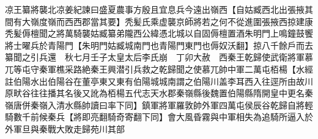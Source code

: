 凉王纂將襲北凉姜紀諫曰盛夏農事方殷且宜息兵今遠出嶺西【自姑臧西北出張掖其間有大嶺度嶺而西西郡當其要】秃髪氏乘虚襲京師將若之何不從進圍張掖西掠建康秃髪傉檀聞之將萬騎襲姑臧纂弟隴西公緯憑北城以自固傉檀置酒朱明門上鳴鐘鼓饗將士曜兵於青陽門【朱明門姑臧城南門也青陽門東門也傉奴沃翻】掠八千餘戶而去纂聞之引兵還　秋七月壬子太皇太后李氏崩　丁卯大赦　西秦王乾歸使武衛將軍慕兀等屯守秦軍樵采路絶秦王興潜引兵救之乾歸聞之使慕兀帥中軍二萬屯栢楊【水經註伯陽水出伯陽谷在董亭東又東有伯陽城城南謂之伯陽川盖李耳西入往逕所由故川原畎谷往往播其名後又訛為栢楊五代志天水郡秦嶺縣後魏置伯陽縣隋開皇中更名秦嶺唐併秦嶺入清水縣帥讀曰率下同】鎮軍將軍羅敦帥外軍四萬屯侯辰谷乾歸自將輕騎數千前候秦兵【將即亮翻騎奇寄翻下同】會大風昏霧與中軍相失為追騎所逼入於外軍旦與秦戰大敗走歸苑川其部